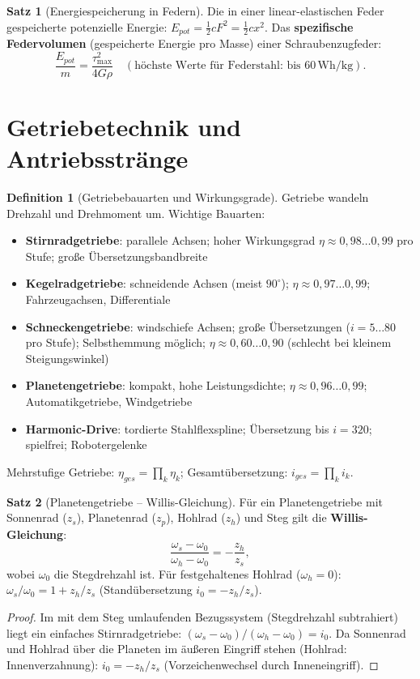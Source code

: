 ﻿\documentclass[a4paper,12pt]{report}
\theoremstyle{definition}
\newtheorem{definition}{Definition}
\newtheorem{satz}{Satz}
\begin{document}
\begin{satz}[Energiespeicherung in Federn]
Die in einer linear-elastischen Feder gespeicherte potenzielle Energie:
$E_{pot} = \tfrac{1}{2}cF^2 = \tfrac{1}{2}cx^2$.
Das \textbf{spezifische Federvolumen} (gespeicherte Energie pro Masse)
einer Schraubenzugfeder:
\[
  \frac{E_{pot}}{m} = \frac{\tau_{\max}^2}{4G\rho} \quad
  (\text{h\"ochste Werte f\"ur Federstahl: bis } 60\,\mathrm{Wh/kg}).
\]
\end{satz}


\section{Getriebetechnik und Antriebsstränge}

\begin{definition}[Getriebebauarten und Wirkungsgrade]
Getriebe wandeln Drehzahl und Drehmoment um. Wichtige Bauarten:
\begin{itemize}
    \item[-] \textbf{Stirnradgetriebe}: parallele Achsen; hoher Wirkungsgrad
          $\eta \approx 0{,}98\ldots0{,}99$ pro Stufe; große Übersetzungsbandbreite
    \item[-] \textbf{Kegelradgetriebe}: schneidende Achsen (meist $90^\circ$);
          $\eta \approx 0{,}97\ldots0{,}99$; Fahrzeugachsen, Differentiale
    \item[-] \textbf{Schneckengetriebe}: windschiefe Achsen; große Übersetzungen
          ($i = 5\ldots80$ pro Stufe); Selbsthemmung möglich;
          $\eta \approx 0{,}60\ldots0{,}90$ (schlecht bei kleinem Steigungswinkel)
    \item[-] \textbf{Planetengetriebe}: kompakt, hohe Leistungsdichte;
          $\eta \approx 0{,}96\ldots0{,}99$; Automatikgetriebe, Windgetriebe
    \item[-] \textbf{Harmonic-Drive}: tordierte Stahlflexspline;
          Übersetzung bis $i = 320$; spielfrei; Robotergelenke
\end{itemize}
Mehrstufige Getriebe: $\eta_{ges} = \prod_k \eta_k$;
Gesamtübersetzung: $i_{ges} = \prod_k i_k$.
\end{definition}

\begin{satz}[Planetengetriebe -- Willis-Gleichung]
Für ein Planetengetriebe mit Sonnenrad ($z_s$), Planetenrad ($z_p$),
Hohlrad ($z_h$) und Steg gilt die \textbf{Willis-Gleichung}:
\[
  \frac{\omega_s - \omega_0}{\omega_h - \omega_0} = -\frac{z_h}{z_s},
\]
wobei $\omega_0$ die Stegdrehzahl ist. Für festgehaltenes Hohlrad
($\omega_h = 0$): $\omega_s/\omega_0 = 1 + z_h/z_s$ (Standübersetzung $i_0 = -z_h/z_s$).
\end{satz}
\begin{proof}
Im mit dem Steg umlaufenden Bezugssystem (Stegdrehzahl subtrahiert)
liegt ein einfaches Stirnradgetriebe: $(\omega_s - \omega_0)/(\omega_h - \omega_0) = i_0$.
Da Sonnenrad und Hohlrad über die Planeten im äußeren Eingriff stehen
(Hohlrad: Innenverzahnung): $i_0 = -z_h/z_s$ (Vorzeichenwechsel durch Inneneingriff).
\end{proof}
\end{document}
